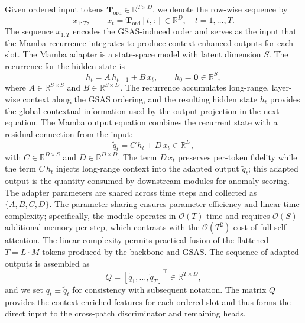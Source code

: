 Given ordered input tokens \(\mathbf{T}_{\mathrm{ord}}\in\mathbb{R}^{T\times D}\), we denote the row-wise sequence by
\begin{equation}
x_{1:T},\qquad x_t=\mathbf{T}_{\mathrm{ord}}[t,:]\in\mathbb{R}^D,\quad t=1,\dots,T.
\end{equation}
The sequence \(x_{1:T}\) encodes the GSAS-induced order and serves as the input that the Mamba recurrence \cite{gu2023mamba} integrates to produce context-enhanced outputs for each slot. The Mamba adapter is a state-space model with latent dimension \(S\). The recurrence for the hidden state is
\begin{equation}
h_t = A\,h_{t-1} + B\,x_t,\qquad h_0=\mathbf{0}\in\mathbb{R}^S,
\end{equation}
where \(A\in\mathbb{R}^{S\times S}\) and \(B\in\mathbb{R}^{S\times D}\). The recurrence accumulates long-range, layer-wise context along the GSAS ordering, and the resulting hidden state \(h_t\) provides the global contextual information used by the output projection in the next equation. The Mamba output equation combines the recurrent state with a residual connection from the input:
\begin{equation}
\tilde{q}_t = C\,h_t + D\,x_t \in\mathbb{R}^D,
\end{equation}
with \(C\in\mathbb{R}^{D\times S}\) and \(D\in\mathbb{R}^{D\times D}\). The term \(D\,x_t\) preserves per-token fidelity while the term \(C\,h_t\) injects long-range context into the adapted output \(\tilde{q}_t\); this adapted output is the quantity consumed by downstream modules for anomaly scoring. The adapter parameters are shared across time steps and collected as \(\{A,B,C,D\}\). The parameter sharing ensures parameter efficiency and linear-time complexity; specifically, the module operates in \(\mathcal{O}(T)\) time and requires \(\mathcal{O}(S)\) additional memory per step, which contrasts with the \(\mathcal{O}(T^2)\) cost of full self-attention. The linear complexity permits practical fusion of the flattened \(T=L\cdot M\) tokens produced by the backbone and GSAS. The sequence of adapted outputs is assembled as
\begin{equation}
Q=[\tilde{q}_1,\dots,\tilde{q}_T]^\top\in\mathbb{R}^{T\times D},
\end{equation}
and we set \(q_t\equiv\tilde{q}_t\) for consistency with subsequent notation. The matrix \(Q\) provides the context-enriched features for each ordered slot and thus forms the direct input to the cross-patch discriminator and remaining heads.

